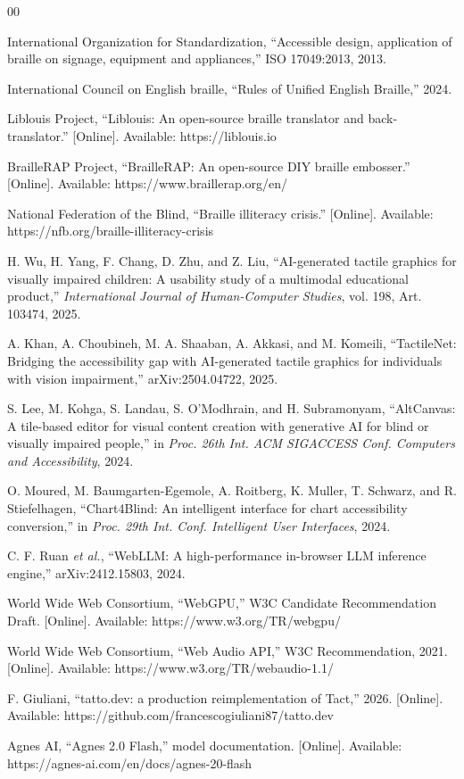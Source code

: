 \documentclass[conference]{IEEEtran}
\begin{document}
\begin{thebibliography}{00}

 International Organization for Standardization, ``Accessible design, application of braille on signage, equipment and appliances,'' ISO 17049:2013, 2013.

 International Council on English braille, ``Rules of Unified English Braille,'' 2024.

 Liblouis Project, ``Liblouis: An open-source braille translator and back-translator.'' [Online]. Available: https://liblouis.io

 BrailleRAP Project, ``BrailleRAP: An open-source DIY braille embosser.'' [Online]. Available: https://www.braillerap.org/en/

 National Federation of the Blind, ``Braille illiteracy crisis.'' [Online]. Available: https://nfb.org/braille-illiteracy-crisis

 H. Wu, H. Yang, F. Chang, D. Zhu, and Z. Liu, ``AI-generated tactile graphics for visually impaired children: A usability study of a multimodal educational product,'' \emph{International Journal of Human-Computer Studies}, vol. 198, Art. 103474, 2025.

 A. Khan, A. Choubineh, M. A. Shaaban, A. Akkasi, and M. Komeili, ``TactileNet: Bridging the accessibility gap with AI-generated tactile graphics for individuals with vision impairment,'' arXiv:2504.04722, 2025.

 S. Lee, M. Kohga, S. Landau, S. O'Modhrain, and H. Subramonyam, ``AltCanvas: A tile-based editor for visual content creation with generative AI for blind or visually impaired people,'' in \emph{Proc. 26th Int. ACM SIGACCESS Conf. Computers and Accessibility}, 2024.

 O. Moured, M. Baumgarten-Egemole, A. Roitberg, K. Muller, T. Schwarz, and R. Stiefelhagen, ``Chart4Blind: An intelligent interface for chart accessibility conversion,'' in \emph{Proc. 29th Int. Conf. Intelligent User Interfaces}, 2024.

 C. F. Ruan \emph{et al.}, ``WebLLM: A high-performance in-browser LLM inference engine,'' arXiv:2412.15803, 2024.

 World Wide Web Consortium, ``WebGPU,'' W3C Candidate Recommendation Draft. [Online]. Available: https://www.w3.org/TR/webgpu/

 World Wide Web Consortium, ``Web Audio API,'' W3C Recommendation, 2021. [Online]. Available: https://www.w3.org/TR/webaudio-1.1/

 F. Giuliani, ``tatto.dev: a production reimplementation of Tact,'' 2026. [Online]. Available: https://github.com/francescogiuliani87/tatto.dev

 Agnes AI, ``Agnes 2.0 Flash,'' model documentation. [Online]. Available: https://agnes-ai.com/en/docs/agnes-20-flash

\end{thebibliography}
\end{document}
